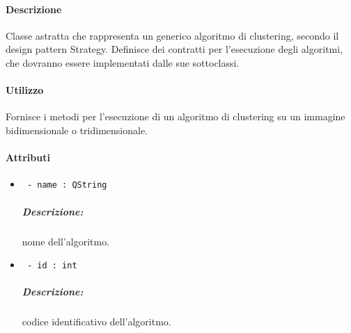 \paragraph{Descrizione \\} Classe astratta che rappresenta un generico algoritmo di clustering\g{}, secondo il design pattern Strategy. Definisce dei contratti per l'esecuzione degli algoritmi, che dovranno essere implementati dalle sue sottoclassi.

\paragraph{Utilizzo\\} Fornisce i metodi per l'esecuzione di un algoritmo di clustering su un immagine bidimensionale o tridimensionale.

\paragraph{Attributi\\}
	\begin{itemize}
		\item  \color{teal}\verb! - name : QString !\\
		\color{black}
		\subparagraph{Descrizione:} nome dell'algoritmo.
		\item  \color{teal}\verb! - id : int !\\
		\color{black}
		\subparagraph{Descrizione:} codice identificativo dell'algoritmo.
	\end{itemize}
	
